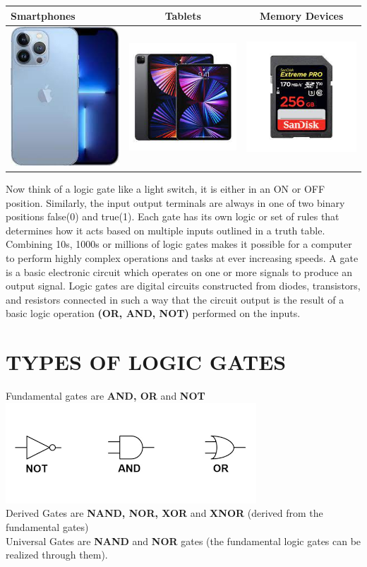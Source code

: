 \documentclass{article}
\begin{document}
\begin{table}[h!]
	\begin{center}
		\begin{tabular}{|l|c|c|}
			\hline
		 Smartphones & Tablets & Memory Devices\\
		 \hline
		 \includegraphics[width=0.2\linewidth]{Unknown-1.jpeg} & \includegraphics[width=0.2\linewidth]{Unknown-2.jpeg} & \includegraphics[width=0.2\linewidth]{Unknown-3.jpeg}\\
		 \hline
	\end{tabular}
\end{center}
\end{table}
\newpage
 Now think of a logic gate like a light switch, it is either in an ON or OFF position. Similarly, the input output terminals are always in one of two binary positions false(0) and true(1). Each gate has its own logic or set of rules that determines how it acts based on multiple inputs outlined in a truth table.
\newpage
Combining 10s, 1000s or millions of logic gates makes it possible for a computer to perform highly complex operations and tasks at ever increasing speeds.
\newpage
A gate is a basic electronic circuit which operates on one or more signals to produce an output signal. 
Logic gates are digital circuits constructed from diodes, transistors, and resistors connected in such a way that the circuit output is the result of a basic logic operation \textbf{(OR, AND, NOT)} performed on the inputs.
\newpage
\section{TYPES OF LOGIC GATES}
Fundamental gates are \textbf{AND, OR} and \textbf{NOT}\\
\includegraphics[width=0.3\linewidth]{images.png}\\
Derived Gates are \textbf{NAND, NOR, XOR} and \textbf{XNOR} (derived from the fundamental gates)\\
Universal Gates are \textbf{NAND} and \textbf{NOR} gates (the fundamental logic gates can be realized through them).
\\
\newpage
\end{document}
